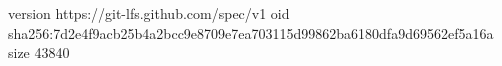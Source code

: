 version https://git-lfs.github.com/spec/v1
oid sha256:7d2e4f9acb25b4a2bcc9e8709e7ea703115d99862ba6180dfa9d69562ef5a16a
size 43840
